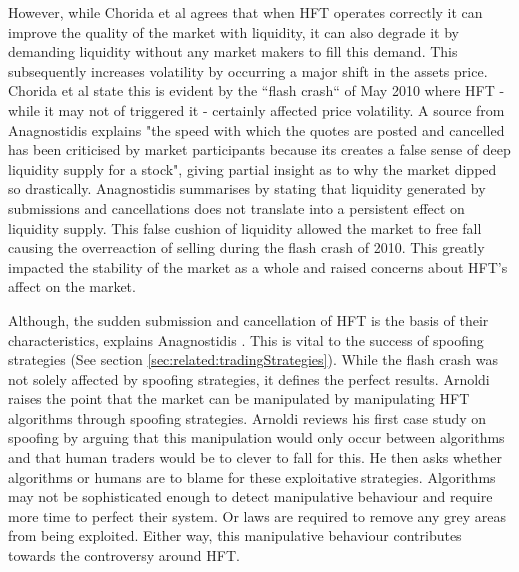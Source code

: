 However, while Chorida et al \cite{REPORT:ChordiaEtAl:2013} agrees that when HFT operates correctly it can improve the quality of the market with liquidity, it can also degrade it by demanding liquidity without any market makers to fill this demand. This subsequently increases volatility by occurring a major shift in the assets price. Chorida et al state this is evident by the ``flash crash`` of May 2010 where HFT - while it may not of triggered it - certainly affected price volatility. A source from Anagnostidis \cite{UNPUB:Anagnostidis:2017} explains "the speed with which the quotes are posted and cancelled has been criticised by market participants because its creates a false sense of deep liquidity supply for a stock", giving partial insight as to why the market dipped so drastically. Anagnostidis summarises by stating that liquidity generated by submissions and cancellations does not translate into a persistent effect on liquidity supply. This false cushion of liquidity allowed the market to free fall causing the overreaction of selling during the flash crash of 2010. This greatly impacted the stability of the market as a whole and raised concerns about HFT's affect on the market.   

Although, the sudden submission and cancellation of HFT is the basis of their characteristics, explains Anagnostidis \cite{UNPUB:Anagnostidis:2017}. This is vital to the success of spoofing strategies (See section \ref{sec:related:tradingStrategies}). While the flash crash was not solely affected by spoofing strategies, it defines the perfect results. Arnoldi \cite{JOURNAL:Arnoldi:2016} raises the point that the market can be manipulated by manipulating HFT algorithms through spoofing strategies. Arnoldi reviews his first case study on spoofing by arguing that this manipulation would only occur between algorithms and that human traders would be to clever to fall for this. He then asks whether algorithms or humans are to blame for these exploitative strategies. Algorithms may not be sophisticated enough to detect manipulative behaviour and require more time to perfect their system. Or laws are required to remove any grey areas from being exploited. Either way, this manipulative behaviour contributes towards the controversy around HFT.

